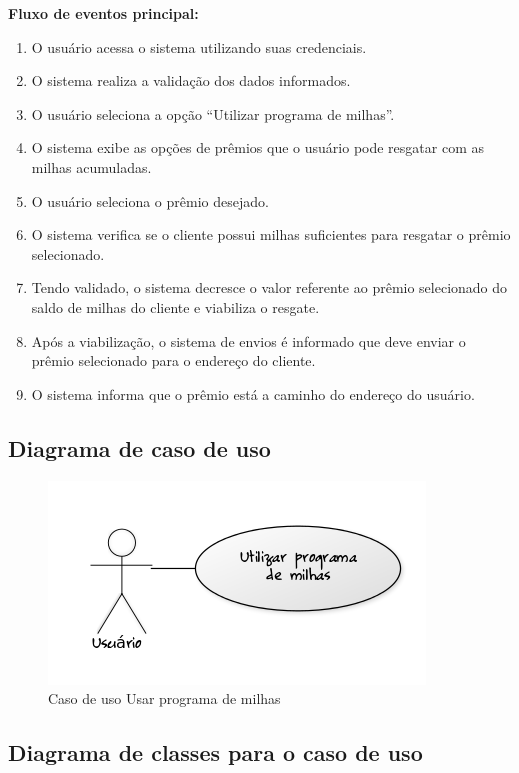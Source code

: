 \textbf{Fluxo de eventos principal:}

\begin{enumerate}
  \item O usuário acessa o sistema utilizando suas credenciais.
  \item O sistema realiza a validação dos dados informados.
  \item O usuário seleciona a opção ``Utilizar programa de milhas''.
  \item O sistema exibe as opções de prêmios que o usuário pode resgatar com as milhas acumuladas.
  \item O usuário seleciona o prêmio desejado.
  \item O sistema verifica se o cliente possui milhas suficientes para resgatar o prêmio selecionado.
  \item Tendo validado, o sistema decresce o valor referente ao prêmio selecionado do saldo de milhas do cliente e viabiliza o resgate.
  \item Após a viabilização, o sistema de envios é informado que deve enviar o prêmio selecionado para o endereço do cliente.
  \item O sistema informa que o prêmio está a caminho do endereço do usuário.
\end{enumerate}

\subsection{Diagrama de caso de uso}

\begin{figure}[!htb]
     \centering
     \includegraphics[scale=0.6]{diagramas/caso-de-uso/imagens/utilizarProgramaMilhas.png}
     \caption{Caso de uso Usar programa de milhas}
\end{figure}

\subsection{Diagrama de classes para o caso de uso}
